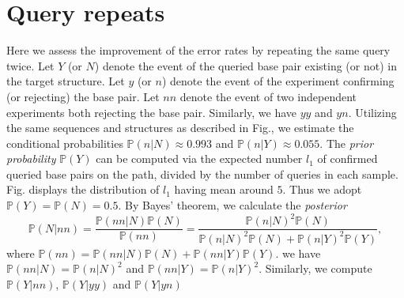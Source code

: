 \documentclass[preprint,authoryear]{elsarticle}
\begin{document}
\section{Query repeats}
Here we assess the improvement of the error rates  by repeating the same query  twice.
Let $Y$ (or $N$) denote the event of the queried base pair  existing (or not) in the target structure. 
Let $y$ (or $n$) denote the event of the experiment confirming (or rejecting) the base pair.
Let $nn$ denote the event of two independent experiments both rejecting the base pair. 
Similarly, we have $yy$ and $y n$.
Utilizing the same sequences and structures as described in  Fig.,
we estimate the conditional probabilities $	\mathbb{P}(n|N)\approx 0.993$ and $	\mathbb{P}(n|Y)\approx 0.055$.
The \emph{prior probability} $\mathbb{P}(Y)$ can be computed via the expected number  $l_1$ 
of confirmed queried base pairs on the path,
divided by the number of queries in each sample. 
Fig. displays the distribution of $l_1$ having mean around $5$.
Thus we adopt 
$\mathbb{P}(Y)= \mathbb{P}(N)=0.5$.
By Bayes' theorem, we calculate the \emph{posterior} 
\[
\mathbb{P}(N|nn)=\frac{\mathbb{P}(nn|N) \mathbb{P}(N)}{\mathbb{P}(nn)}=\frac{\mathbb{P}(n|N)^2 \mathbb{P}(N)}{\mathbb{P}(n|N)^2 \mathbb{P}(N) +\mathbb{P}(n|Y)^2\mathbb{P}(Y)},
\]
where $\mathbb{P}(nn)=\mathbb{P}(nn|N) \mathbb{P}(N) + \mathbb{P}(nn|Y) \mathbb{P}(Y)$.
we have $\mathbb{P}(nn|N) =\mathbb{P}(n|N)^2$ and $\mathbb{P}(nn|Y) =\mathbb{P}(n|Y)^2$.
Similarly, we compute $\mathbb{P}(Y|nn)$, $\mathbb{P}(Y|yy)$ and $\mathbb{P}(Y|yn)$
\end{document}
